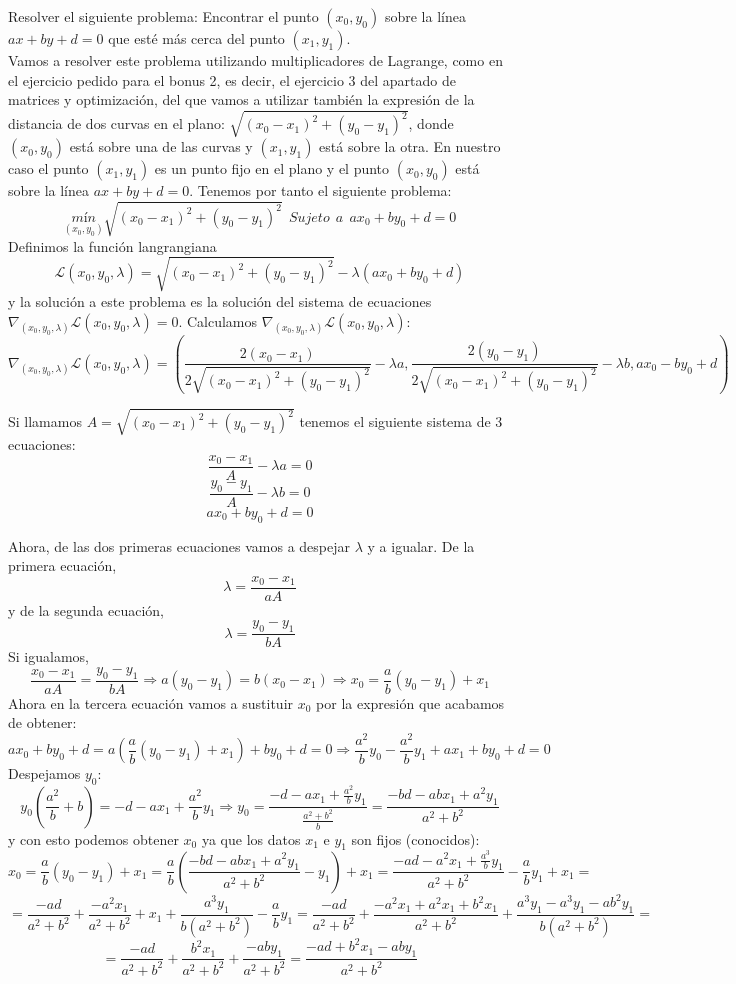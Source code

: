 \documentclass[12pt]{article}
\theoremstyle{definition}
\begin{document}
\begin{pregunta}
Resolver el siguiente problema: Encontrar el punto $(x_0,y_0)$ sobre la línea $ax+by+d=0$ que esté más cerca del punto $(x_1,y_1)$.\\

Vamos a resolver este problema utilizando multiplicadores de Lagrange, como en el ejercicio pedido para el bonus 2, es decir, el ejercicio 3 del apartado de matrices y optimización, del que vamos a utilizar también la expresión de la distancia de dos curvas en el plano: $\sqrt{(x_0-x_1)^2+(y_0-y_1)^2}$, donde $(x_0,y_0)$ está sobre una de las curvas y $(x_1,y_1)$ está sobre la otra. En nuestro caso el punto $(x_1,y_1)$ es un punto fijo en el plano y el punto $(x_0,y_0)$ está sobre la línea $ax+by+d=0$. Tenemos por tanto el siguiente problema:\\
\[	\underset{(x_0,y_0)}{mín}\sqrt{(x_0-x_1)^2+(y_0-y_1)^2} \ \ Sujeto\ \ a\ \ ax_0+by_0+d=0 \]
Definimos la función langrangiana
\[	\mathcal{L}(x_0,y_0,\lambda)=\sqrt{(x_0-x_1)^2+(y_0-y_1)^2} - \lambda(ax_0+by_0+d) \]
y la solución a este problema es la solución del sistema de ecuaciones $\nabla_{(x_0,y_0,\lambda)}\mathcal{L}(x_0,y_0,\lambda)=0$. Calculamos $\nabla_{(x_0,y_0,\lambda)}\mathcal{L}(x_0,y_0,\lambda)$:
\[ \nabla_{(x_0,y_0,\lambda)}\mathcal{L}(x_0,y_0,\lambda) = (\frac{2(x_0-x_1)}{2\sqrt{(x_0-x_1)^2+(y_0-y_1)^2}} - \lambda a,
	\frac{2(y_0-y_1)}{2\sqrt{(x_0-x_1)^2+(y_0-y_1)^2}}-\lambda b, ax_0-by_0+d)\]

Si llamamos $A=\sqrt{(x_0-x_1)^2+(y_0-y_1)^2}$ tenemos el siguiente sistema de 3 ecuaciones:
\[	\frac{x_0-x_1}{A} - \lambda a = 0	\]
\[	\frac{y_0-y_1}{A} - \lambda b = 0	\]
\[	ax_0+by_0+d = 0		\]

Ahora, de las dos primeras ecuaciones vamos a despejar $\lambda$ y a igualar. De la primera ecuación,
\[	\lambda = \frac{x_0-x_1}{aA}	\] y de la segunda ecuación,
\[	\lambda = \frac{y_0-y_1}{bA}	\]
Si igualamos,
\[	\frac{x_0-x_1}{aA} = \frac{y_0-y_1}{bA} \Rightarrow a(y_0-y_1) = b(x_0-x_1) \Rightarrow x_0 = \frac{a}{b}(y_0-y_1)+x_1	\]
Ahora en la tercera ecuación vamos a sustituir $x_0$ por la expresión que acabamos de obtener:
\[	ax_0+by_0+d = a(\frac{a}{b}(y_0-y_1)+x_1)+by_0+d = 0 \Rightarrow \frac{a^2}{b}y_0-\frac{a^2}{b}y_1+ax_1+by_0+d=0	\]
Despejamos $y_0$:
\[	y_0(\frac{a^2}{b}+b) = -d-ax_1+\frac{a^2}{b}y_1 \Rightarrow y_0=\frac{-d-ax_1+\frac{a^2}{b}y_1}{\frac{a^2+b^2}{b}} = \frac{-bd - abx_1 + a^2y_1}{a^2+b^2}	\]
y con esto podemos obtener $x_0$ ya que los datos $x_1$ e $y_1$ son fijos (conocidos):
\[	x_0 = \frac{a}{b}(y_0-y_1)+x_1 = \frac{a}{b}(\frac{-bd - abx_1 + a^2y_1}{a^2+b^2}-y_1)+x_1 = \frac{-ad - a^2x_1 + \frac{a^3}{b}y_1}{a^2+b^2}-\frac{a}{b}y_1+x_1	= \]
\[	= \frac{-ad}{a^2+b^2} + \frac{-a^2x_1}{a^2+b^2} + x_1 +\frac{a^3y_1}{b(a^2+b^2)} -\frac{a}{b}y_1 = 
	\frac{-ad}{a^2+b^2} + \frac{-a^2x_1 + a^2x_1 + b^2x_1}{a^2+b^2} + \frac{a^3y_1 - a^3y_1 - ab^2y_1}{b(a^2+b^2)} = 	\]
\[	= \frac{-ad}{a^2+b^2} + \frac{b^2x_1}{a^2+b^2} + \frac{- aby_1}{a^2+b^2}	 = 
	\frac{-ad + b^2x_1 - aby_1}{a^2+b^2}	\]


\end{pregunta}
\end{document}
